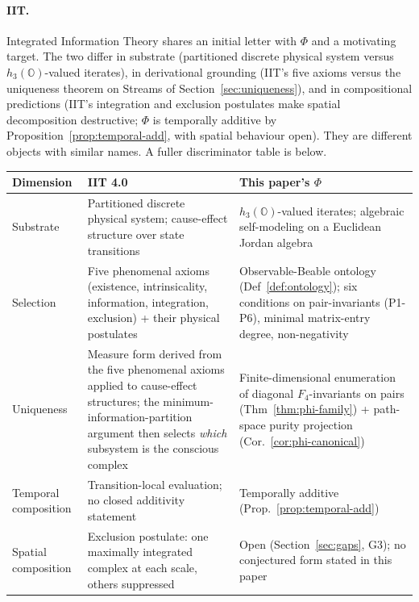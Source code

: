 \documentclass[12pt]{article}
\theoremstyle{remark}
\newcommand{\hthree}{h_3(\mathbb{O})}
\newcommand{\Ffour}{F_4}
\newcommand{\Phiexp}{\Phi}
\begin{document}
\paragraph{IIT.} Integrated Information Theory
\cite{oizumi2014,tononi2016,albantakis2023} shares an initial letter
with $\Phiexp$ and a motivating target. The two differ in substrate
(partitioned discrete physical system versus $\hthree$-valued iterates),
in derivational grounding (IIT's five axioms versus the uniqueness
theorem on Streams of Section~\ref{sec:uniqueness}), and in compositional
predictions (IIT's integration and exclusion postulates make spatial
decomposition destructive; $\Phiexp$ is temporally additive by
Proposition~\ref{prop:temporal-add}, with spatial behaviour open).
They are different objects with similar names. A fuller
discriminator table is below.

\begin{table}[H]
\centering
\small
\begin{tabular}{@{}p{}p{}p{}@{}}
\toprule
\textbf{Dimension} & \textbf{IIT 4.0} & \textbf{This paper's $\Phiexp$} \\
\midrule
Substrate & Partitioned discrete physical system; cause-effect structure over state transitions & $\hthree$-valued iterates; algebraic self-modeling on a Euclidean Jordan algebra \\
Selection & Five phenomenal axioms (existence, intrinsicality, information, integration, exclusion) + their physical postulates & Observable-Beable ontology (Def~\ref{def:ontology}); six conditions on pair-invariants (P1-P6), minimal matrix-entry degree, non-negativity \\
Uniqueness & Measure form derived from the five phenomenal axioms applied to cause-effect structures; the minimum-information-partition argument then selects \emph{which} subsystem is the conscious complex & Finite-dimensional enumeration of diagonal $\Ffour$-invariants on pairs (Thm~\ref{thm:phi-family}) + path-space purity projection (Cor.~\ref{cor:phi-canonical}) \\
Temporal composition & Transition-local evaluation; no closed additivity statement & Temporally additive (Prop.~\ref{prop:temporal-add}) \\
Spatial composition & Exclusion postulate: one maximally integrated complex at each scale, others suppressed & Open (Section~\ref{sec:gaps}, G3); no conjectured form stated in this paper \\
\bottomrule
\end{tabular}
\end{table}
\end{document}
